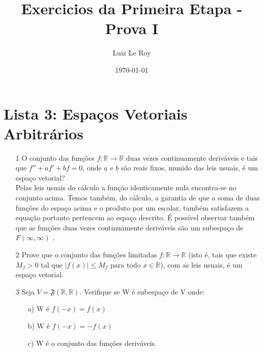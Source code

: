 \documentclass[a4paper]{article}
\title{Exercicios da Primeira Etapa - Prova I}
\date{\mydate\today}
\author{Luiz Le Roy}
\begin{document}
  \maketitle

\section*{Lista 3: Espaços Vetoriais Arbitrários}
\begin{itemize}
\item[1] O conjunto das funções $f:\mathbb{R}\longrightarrow \mathbb{R}$ duas vezes continuamente deriváveis e tais que $f''+af'+bf=0$, onde $\underline{a}$ e $\underline{b}$ são reais fixos, munido das leis usuais, é um espaço vetorial?
\\\textcolor[rgb]{0,0,1}{Pelas leis usuais do cálculo a função identicamente nula encontra-se no conjunto acima. Temos também, do cálculo, a garantia de que a soma de duas funções do espaço acima e o produto por um escalar, também satisfazem a equação portanto pertencem ao espaço descrito. É possível observar também que as funções duas vezes continuamente deriváveis são um subespaço de $F(\infty,\infty)$ .%
}
\item[2] Prove que o conjunto das funções limitadas $f:\mathbb{R}\longrightarrow \mathbb{R}$ (isto é, tais que existe $M_f>0$ tal que $|f(x)|\leq M_f$ para todo $x\in \mathbb{R}$), com as leis usuais, é um espaço vetorial.

\item[3] Seja $V=\mathfrak{F}(\mathbb{R,R})$. Verifique se W é subespaço de V onde:
\begin{itemize}
\item [a)] W é $f(-x)=f(x)$
\item [b)] W é $f(-x)=-f(x)$
\item[c)] W é o conjunto das funções deriváveis.
\end{itemize}


\end{itemize}
\end{document}
